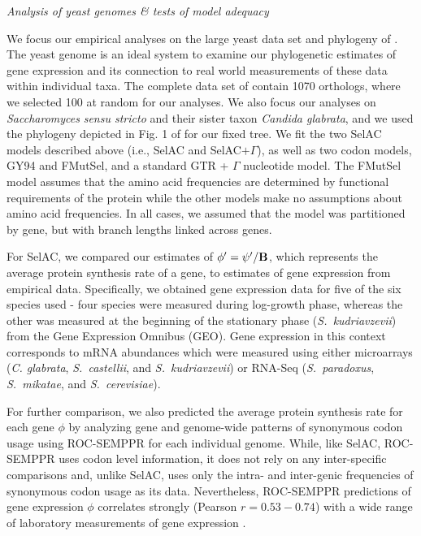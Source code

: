 \documentclass[12pt,letterpaper,fleqn]{article}
\renewcommand{\subsection}[1]{%
\bigskip
\begin{center}
\begin{large}
\normalfont\itshape #1
\end{large}
\end{center}}
\newcommand{\Func}{\ensuremath{\text{\textbf{B}}}\xspace}
\newcommand{\selac}{SelAC\xspace}
\newcommand{\selacplusgamma}{SelAC$+\Gamma$\xspace}
\newcommand{\phiprime}{\ensuremath{\phi^\prime}\xspace}
\newcommand{\psiprime}{\ensuremath{\psi^\prime}\xspace}
\begin{document}
\subsection{Analysis of yeast genomes \& tests of model adequacy} \label{sec:analysis}
We focus our empirical analyses on the large yeast data set and phylogeny of \citet{SalichosAndRokas2013}.
The yeast genome is an ideal system to examine our phylogenetic estimates of gene expression and its connection to real world measurements of these data within individual taxa.
The complete data set of \citet{SalichosAndRokas2013} contain 1070 orthologs, where we selected 100 at random for our analyses.
We also focus our analyses on \emph{Saccharomyces} \emph{sensu stricto} and their sister taxon \emph{Candida glabrata}, and we used the phylogeny depicted in Fig. 1 of \citet{SalichosAndRokas2013} for our fixed tree.
We fit the two \selac models described above (i.e., \selac and \selacplusgamma), as well as two codon models, GY94 and FMutSel, and a standard GTR + $\Gamma$ nucleotide model.
The FMutSel model assumes that the amino acid frequencies are determined by functional requirements of the protein while the other models make no assumptions about amino acid frequencies.
In all cases, we assumed that the model was partitioned by gene, but with branch lengths linked across genes.

For \selac, we compared our estimates of $\phiprime = \psiprime/\Func$, which represents the average protein synthesis rate of a gene, to estimates of gene expression from empirical data.
Specifically, we obtained gene expression data for five of the six species used - four species were measured during log-growth phase, whereas the other was measured at the beginning of the stationary phase (\emph{S.~kudriavzevii}) from the Gene Expression Omnibus (GEO).
Gene expression in this context corresponds to mRNA abundances which were measured using either microarrays (\emph{C. glabrata}, \emph{S.~castellii}, and \emph{S.~kudriavzevii}) or RNA-Seq (\emph{S.~paradoxus}, \emph{S.~mikatae}, and \emph{S.~cerevisiae}).

For further comparison, we also predicted the average protein synthesis rate for each gene $\phi$ by analyzing gene and genome-wide patterns of synonymous codon usage using ROC-SEMPPR \citep{GilchristEtAl2015} for each individual genome.
While, like \selac, ROC-SEMPPR uses codon level information, it does not rely on any inter-specific comparisons and, unlike \selac, uses only the intra- and inter-genic frequencies of synonymous codon usage as its data.
Nevertheless, ROC-SEMPPR predictions of gene expression $\phi$ correlates strongly (Pearson $r= 0.53-0.74$) with a wide range of laboratory measurements of gene expression \citep{GilchristEtAl2015}.
\end{document}
